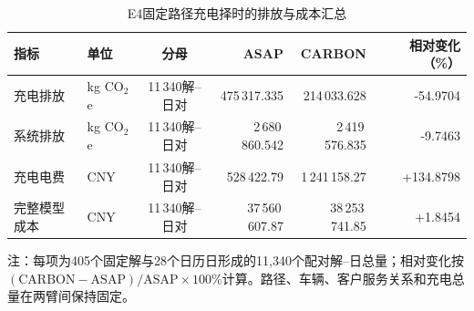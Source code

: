 \begin{table}[!htbp]
\centering
\caption{E4固定路径充电择时的排放与成本汇总}
\label{tab:e4-main}
\small
\begin{tabular}{llcrrr}
\toprule
指标 & 单位 & 分母 & ASAP & CARBON & 相对变化（\%） \\
\midrule
充电排放 & kg CO$_2$e & 11\,340解--日对 & 475\,317.335 & 214\,033.628 & -54.9704 \\
系统排放 & kg CO$_2$e & 11\,340解--日对 & 2\,680\,860.542 & 2\,419\,576.835 & -9.7463 \\
充电电费 & CNY & 11\,340解--日对 & 528\,422.79 & 1\,241\,158.27 & +134.8798 \\
完整模型成本 & CNY & 11\,340解--日对 & 37\,560\,607.87 & 38\,253\,741.85 & +1.8454 \\
\bottomrule
\end{tabular}

\vspace{2pt}
\begin{minipage}{0.94\textwidth}
\footnotesize 注：每项为405个固定解与28个日历日形成的11,340个配对解--日总量；相对变化按$(\mathrm{CARBON}-\mathrm{ASAP})/\mathrm{ASAP}\times100\%$计算。路径、车辆、客户服务关系和充电总量在两臂间保持固定。
\end{minipage}
\end{table}
